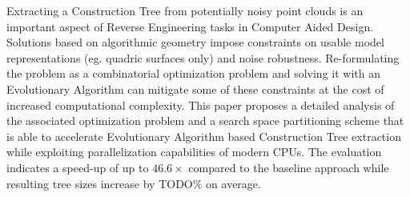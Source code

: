 Extracting a Construction Tree from potentially noisy point clouds is an important aspect of Reverse Engineering tasks in Computer Aided Design. 
Solutions based on algorithmic geometry impose constraints on usable model representations (eg. quadric surfaces only) and noise robustness. 
Re-formulating the problem as a combinatorial optimization problem and solving it with an Evolutionary Algorithm can mitigate some of these constraints at the cost of increased computational complexity. 
This paper proposes a detailed analysis of the associated optimization problem and a search space partitioning scheme that is able to accelerate Evolutionary Algorithm based Construction Tree extraction while exploiting parallelization capabilities of modern CPUs.
The evaluation indicates a speed-up of up to $46.6\times$ compared to the baseline approach while resulting tree sizes increase by TODO$\%$ on average. 
